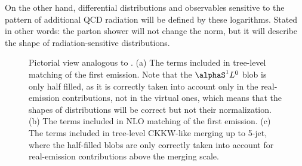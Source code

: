 On the other hand, differential distributions and observables
sensitive to the pattern of additional QCD radiation will be defined
by these logarithms.  Stated in other words: the parton shower will
not change the norm, but it will describe the shape of
radiation-sensitive distributions.

\begin{figure}
\begin{center}
\hfil{}\hfil{}\hfil{}\hfil
\caption{Pictorial view analogous to
  . (a) The terms included in tree-level
  matching of the first emission. Note that the $\alphaS^1L^0$ blob
  is only half filled, as it is correctly taken into account only in
  the real-emission contributions, not in the virtual ones, which
  means that the shapes of distributions will be correct but not their
  normalization. (b) The terms included in NLO matching of the first
  emission. (c) The terms included in tree-level CKKW-like merging up
  to 5-jet, where the half-filled blobs are only correctly taken into
  account for real-emission contributions above the merging
  scale.\label{fig:matching-ordersNLO}}
\end{center}
\end{figure}

